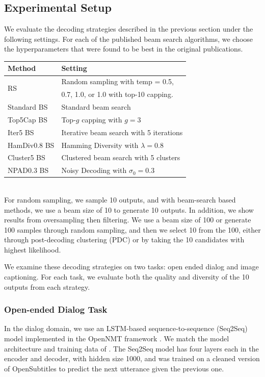 \subsection{Experimental Setup}
We evaluate the decoding strategies described in the previous section under the following settings.
For each of the published beam search algorithms, we choose the hyperparameters that were found to be best in the original publications.\\

\small
\begin{tabular}{l|l}
    \toprule
    Method & Setting\\
    \midrule
    \multirow{2}{*}{RS} & Random sampling with temp = 0.5,\\
    & 0.7, 1.0, or 1.0 with top-10 capping.\\
    Standard BS & Standard beam search\\
    Top5Cap BS & Top-$g$ capping with $g=3$\\
    Iter5 BS & Iterative beam search with 5 iterations\\
    HamDiv0.8 BS & Hamming Diversity with $\lambda=0.8$\\
    Cluster5 BS & Clustered beam search with 5 clusters\\
    NPAD0.3 BS & Noisy Decoding with $\sigma_0=0.3$ \\
    \bottomrule
\end{tabular}
\normalsize
\\

For random sampling, we sample 10 outputs, and with beam-search based methods, we use a beam size of 10 to generate 10 outputs.
In addition, we show results from oversampling then filtering.
We use a beam size of 100 or generate 100 samples through random sampling, and then we select 10 from the 100, either through post-decoding clustering (PDC) or by taking the 10 candidates with highest likelihood. 

We examine these decoding strategies on two tasks: open ended dialog and image captioning.
For each task, we evaluate both the quality and diversity of the 10 outputs from each strategy.

\subsubsection{Open-ended Dialog Task}
In the dialog domain, we use an LSTM-based sequence-to-sequence (Seq2Seq) model implemented in the OpenNMT framework \cite{opennmt}.
We match the model architecture and training data of \citet{baheti2018generating}.
The Seq2Seq model has four layers each in the encoder and decoder, with hidden size 1000, and was trained on a cleaned version of OpenSubtitles \cite{tiedemann2009news} to predict the next utterance given the previous one.


